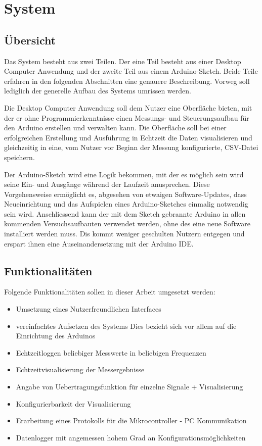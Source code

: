 \chapter{System}
\section{Übersicht}
Das System besteht aus zwei Teilen. Der eine Teil besteht aus einer Desktop Computer Anwendung und der zweite Teil  aus einem Arduino-Sketch.
Beide Teile erfahren in den folgenden Abschnitten eine genauere Beschreibung. Vorweg soll lediglich der generelle Aufbau des Systems umrissen werden.

Die Desktop Computer Anwendung soll dem Nutzer eine Oberfläche bieten, mit der er ohne Programmierkenntnisse einen Messungs- und Steuerungsaufbau für den Arduino erstellen und verwalten kann. Die Oberfläche soll bei einer erfolgreichen Erstellung und Ausführung in Echtzeit die Daten visualisieren und gleichzeitig in eine, vom Nutzer vor Beginn der Messung konfigurierte, \acrshort{CSV}-Datei speichern.

Der Arduino-Sketch wird eine Logik bekommen, mit der es möglich sein wird seine Ein- und Ausgänge während der Laufzeit anusprechen. Diese Vorgehensweise ermöglicht es, abgesehen von etwaigen Software-Updates, dass Neueinrichtung und das Aufspielen eines Arduino-Sketches einmalig notwendig sein wird. Anschliessend kann der mit dem Sketch gebrannte Arduino in allen kommenden Versuchsaufbauten verwendet werden, ohne des eine neue Software installiert werden muss. Dis kommt weniger geschulten Nutzern entgegen und erspart ihnen eine Auseinandersetzung mit der Arduino \acrshort{IDE}.


\section{Funktionalitäten}
Folgende Funktionalitäten sollen in dieser Arbeit umgesetzt werden:
\begin{itemize}
 \item Umsetzung eines Nutzerfreundlichen Interfaces
 \item vereinfachtes Aufsetzen des Systems
 \subitem Dies bezieht sich vor allem auf die Einrichtung des Arduinos
 \item Echtzeitloggen beliebiger Messwerte in beliebigen Frequenzen
 \item Echtzeitvisualisierung der Messergebnisse
 \item Angabe von \gls{Uebertragungsfunktion} für einzelne Signale + Visualisierung
 \item Konfigurierbarkeit der Visualisierung
 \item Erarbeitung eines Protokolls für die Mikrocontroller - PC Kommunikation
 \item Datenlogger mit angemessen hohem Grad an Konfigurationsmöglichkeiten
\end{itemize}

